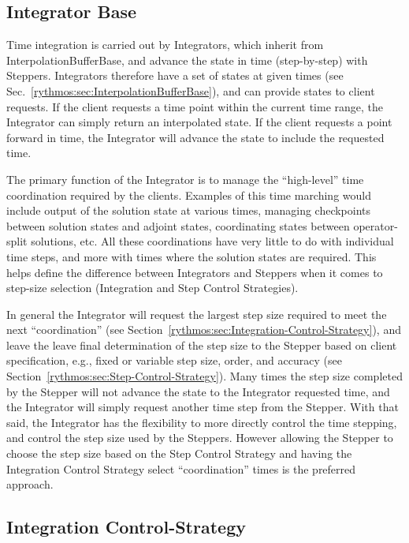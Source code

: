 \subsection{Integrator Base}

Time integration is carried out by Integrators, which inherit from
InterpolationBufferBase, and advance the state in time (step-by-step)
with Steppers. Integrators therefore have a set of states at given
times (see Sec.~\ref{rythmos:sec:InterpolationBufferBase}), and
can provide states to client requests. If the client requests a time
point within the current time range, the Integrator can simply return
an interpolated state. If the client requests a point forward in time,
the Integrator will advance the state to include the requested time.

The primary function of the Integrator is to manage the ``high-level''
time coordination required by the clients. Examples of this time marching
would include output of the solution state at various times, managing
checkpoints between solution states and adjoint states, coordinating
states between operator-split solutions, etc. All these coordinations
have very little to do with individual time steps, and more with times
where the solution states are required. This helps define the difference
between Integrators and Steppers when it comes to step-size selection
(Integration and Step Control Strategies).

In general the Integrator will request the largest step size required
to meet the next ``coordination'' (see Section~\ref{rythmos:sec:Integration-Control-Strategy}),
and leave the leave final determination of the step size to the Stepper
based on client specification, e.g., fixed or variable step size,
order, and accuracy (see Section~\ref{rythmos:sec:Step-Control-Strategy}).
Many times the step size completed by the Stepper will not advance
the state to the Integrator requested time, and the Integrator will
simply request another time step from the Stepper. With that said,
the Integrator has the flexibility to more directly control the time
stepping, and control the step size used by the Steppers. However
allowing the Stepper to choose the step size based on the Step Control
Strategy and having the Integration Control Strategy select ``coordination''
times is the preferred approach.


\subsection{Integration Control-Strategy\label{rythmos:sec:Integration-Control-Strategy}}

